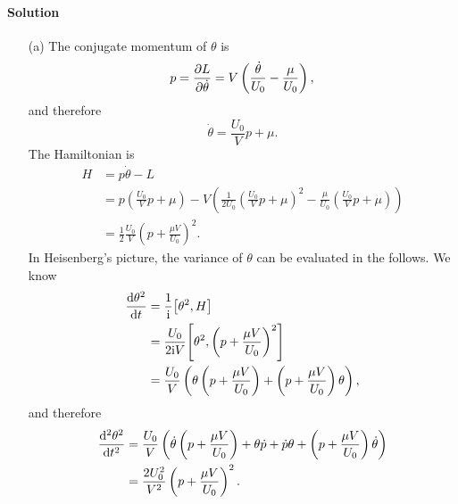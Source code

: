 \documentclass[hyperref, a4paper]{article}
\newcommand*{\ii}{\mathrm{i}}
\begin{document}
\paragraph{Solution} \begin{itemize}
\item[(a)] The conjugate momentum of $\theta$ is 
\begin{equation}
    p = \pdv{L}{\dot{\theta}}
    = V \left( \frac{\dot{\theta}}{U_0} - \frac{\mu}{U_0} \right),
\end{equation}
and therefore 
\begin{equation}
    \dot{\theta} = \frac{U_0}{V} p + \mu.
\end{equation}
The Hamiltonian is 
\begin{equation}
    \begin{aligned}
        H &= p \dot{\theta} - L \\
        &= p \left( \frac{U_0}{V} p + \mu \right) - 
        V \left( 
            \frac{1}{2U_0} \left( \frac{U_0}{V} p + \mu \right)^2 
            - \frac{\mu}{U_0} \left( \frac{U_0}{V} p + \mu \right) 
        \right) \\ 
        &= \frac{1}{2} \frac{U_0}{V} \left( p + \frac{\mu V}{U_0} \right)^2.
    \end{aligned}
\end{equation}
In Heisenberg's picture, the variance of $\theta$ can be evaluated in the follows.
We know 
\[
    \begin{aligned}
        \dv{\theta^2}{t} &= \frac{1}{\ii} \comm{\theta^2}{H} \\
        &= \frac{U_0}{2 \ii V} \comm{\theta^2}{\left( p + \frac{\mu V}{U_0} \right)^2} \\
        &= \frac{U_0}{V} \left(
            \theta \left( p + \frac{\mu V}{U_0} \right)
            + \left( p + \frac{\mu V}{U_0} \right) \theta
        \right),
    \end{aligned}
\]
and therefore 
\begin{equation}
    \begin{aligned}
        \dv[2]{\theta^2}{t} &= \frac{U_0}{V} \left(
            \dot{\theta} \left( p + \frac{\mu V}{U_0} \right)
            + \theta \dot{p} 
            + \dot{p} \theta + 
            \left(p + \frac{\mu V}{U_0}\right) \dot{\theta} 
        \right) \\
        &= \frac{2 U_0^2}{V^2} \left( p + \frac{\mu V}{U_0} \right)^2.
    \end{aligned}
    \label{eq:eom-sigma-op}
\end{equation}

\end{itemize}
\end{document}
